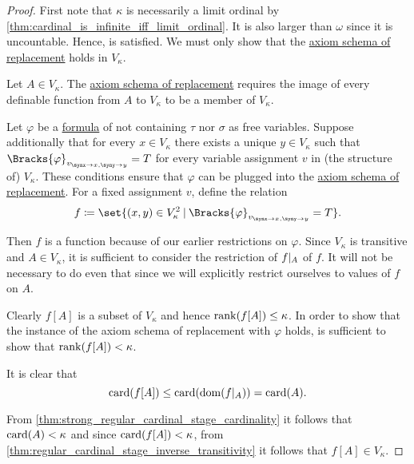 \begin{proof}
  First note that \( \kappa \) is necessarily a limit ordinal by \cref{thm:cardinal_is_infinite_iff_limit_ordinal}. It is also larger than \( \omega \) since it is uncountable. Hence,  is satisfied. We must only show that the \hyperref[def:zfc/replacement]{axiom schema of replacement} holds in \( V_\kappa \).

  Let \( A \in V_\kappa \). The \hyperref[def:zfc/replacement]{axiom schema of replacement} requires the image of every definable function from \( A \) to \( V_\kappa \) to be a member of \( V_\kappa \).

  Let \( \varphi \) be a \hyperref[def:first_order_syntax/formula]{formula} of \hyperref[def:zfc]{} not containing \( \tau \) nor \( \sigma \) as free variables. Suppose additionally that for every \( x \in V_\kappa \) there exists a unique \( y \in V_\kappa \) such that \( \Bracks{\varphi}_{v_{\synx \to x, \syny \to y}} = T \) for every variable assignment \( v \) in (the structure of) \( V_\kappa \). These conditions ensure that \( \varphi \) can be plugged into the \hyperref[def:zfc/replacement]{axiom schema of replacement}. For a fixed assignment \( v \), define the relation
  \begin{equation*}
    f \coloneqq \set{ (x, y) \in V_\kappa^2 \given \Bracks{\varphi}_{v_{\synx \to x, \syny \to y}} = T }.
  \end{equation*}

  Then \( f \) is a function because of our earlier restrictions on \( \varphi \). Since \( V_\kappa \) is transitive and \( A \in V_\kappa \), it is sufficient to consider the restriction of \( f\vert_A \) of \( f \). It will not be necessary to do even that since we will explicitly restrict ourselves to values of \( f \) on \( A \).

  Clearly \( f[A] \) is a subset of \( V_\kappa \) and hence \( \operatorname{rank}(f[A]) \leq \kappa \). In order to show that the instance of the axiom schema of replacement with \( \varphi \) holds, is sufficient to show that \( \operatorname{rank}(f[A]) < \kappa \).

  It is clear that
  \begin{equation*}
    \operatorname{card}(f[A]) \leq \operatorname{card}(\operatorname{dom}(f\vert_A)) = \operatorname{card}(A).
  \end{equation*}

  From \cref{thm:strong_regular_cardinal_stage_cardinality} it follows that \( \operatorname{card}(A) < \kappa \) and since \( \operatorname{card}(f[A]) < \kappa \), from \cref{thm:regular_cardinal_stage_inverse_transitivity} it follows that \( f[A] \in V_\kappa \).
\end{proof}

